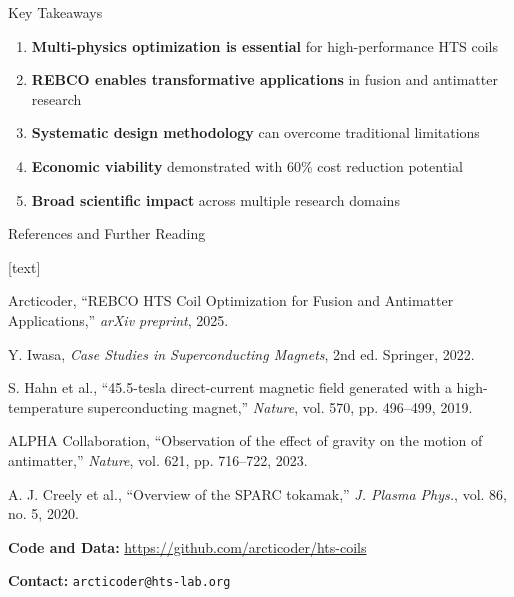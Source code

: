 \documentclass[aspectratio=169,xcolor={table,dvipsnames}]{beamer}
\begin{document}
\begin{frame}{Key Takeaways}
    \begin{enumerate}
        \item \textbf{Multi-physics optimization is essential} for high-performance HTS coils
        \item \textbf{REBCO enables transformative applications} in fusion and antimatter research
        \item \textbf{Systematic design methodology} can overcome traditional limitations
        \item \textbf{Economic viability} demonstrated with 60\% cost reduction potential
        \item \textbf{Broad scientific impact} across multiple research domains
    \end{enumerate}
    
    \vspace{0.5cm}
    \begin{center}
    \end{center}
\end{frame}

\begin{frame}{References and Further Reading}
    \begin{thebibliography}{10}
        [text]
        
         Arcticoder, ``REBCO HTS Coil Optimization for Fusion and Antimatter Applications,'' \textit{arXiv preprint}, 2025.
        
         Y. Iwasa, \textit{Case Studies in Superconducting Magnets}, 2nd ed. Springer, 2022.
        
         S. Hahn et al., ``45.5-tesla direct-current magnetic field generated with a high-temperature superconducting magnet,'' \textit{Nature}, vol. 570, pp. 496--499, 2019.
        
         ALPHA Collaboration, ``Observation of the effect of gravity on the motion of antimatter,'' \textit{Nature}, vol. 621, pp. 716--722, 2023.
        
         A. J. Creely et al., ``Overview of the SPARC tokamak,'' \textit{J. Plasma Phys.}, vol. 86, no. 5, 2020.
        
    \end{thebibliography}
    
    \vspace{0.5cm}
    \textbf{Code and Data:} \url{https://github.com/arcticoder/hts-coils}
    
    \textbf{Contact:} \texttt{arcticoder@hts-lab.org}
\end{frame}
\end{document}
